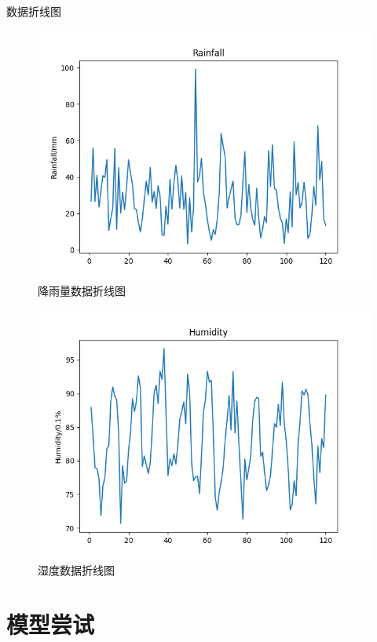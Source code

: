 \documentclass[10pt]{beamer}
\begin{document}
\begin{frame}
\begin{block}{数据折线图}
		\begin{figure}[h!]
			\centering
			\includegraphics[scale=0.21]{../src/prepare_data/rr.png}
			\caption{降雨量数据折线图}
		\end{figure}

		\begin{figure}[h!]
			\centering
			\includegraphics[scale=0.21]{../src/prepare_data/hu.png}
			\caption{湿度数据折线图}
		\end{figure}

	\end{block}

\end{frame}

\section{模型尝试}
\end{document}
